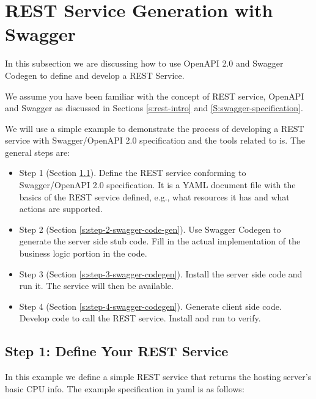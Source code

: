 
\section{REST Service Generation with Swagger}
\label{c:swagger-codegen}


In this subsection we are discussing how to use OpenAPI 2.0 and Swagger
Codegen to define and develop a REST Service.

We assume you have been familiar with the concept of REST service,
OpenAPI and Swagger as discussed in Sections
\ref{s:rest-intro} and \ref{S:swagger-specification}.

We will use a simple example to demonstrate the process of developing a
REST service with Swagger/OpenAPI 2.0 specification and the tools
related to is. The general steps are:

\begin{itemize}
\item Step 1 (Section \ref{s:step-1-define-your-rest-service}). Define
  the REST service conforming to Swagger/OpenAPI 2.0 specification. It
  is a YAML document file with the basics of the REST service defined,
  e.g., what resources it has and what actions are supported.
\item Step 2 (Section \ref{s:step-2-swagger-code-gen}). Use Swagger
  Codegen to generate the server side stub code.  Fill in the actual
  implementation of the business logic portion in the code.
\item Step 3 (Section \ref{s:step-3-swagger-codegen}). Install the
  server side code and run it. The service will then be available.
\item Step 4 (Section \ref{s:step-4-swagger-codegen}). Generate client
  side code. Develop code to call the REST service. Install and run to
  verify.
\end{itemize}

\subsection{Step 1: Define Your REST  Service}
\label{s:step-1-define-your-rest-service}

In this example we define a simple REST service that returns the hosting
server's basic CPU info. The example specification in yaml is as
follows:

